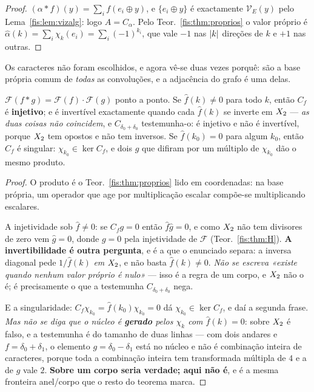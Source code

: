 \documentclass[livro.tex]{subfiles}
\begin{document}
\begin{proof}
$(\alpha*f)(y)=\sum_i f(e_i\oplus y)$, e $\{e_i\oplus y\}$ é exactamente
$\mathcal{V}_E(y)$ pelo Lema~\ref{fis:lem:vizalg}: logo $A=C_\alpha$. Pelo Teor.~\ref{fis:thm:proprios} o valor próprio é
$\widehat{\alpha}(k)=\sum_i\chi_k(e_i)=\sum_i(-1)^{k_i}$, que vale $-1$ nas
$\lvert k\rvert$ direções de $k$ e $+1$ nas outras.
\end{proof}

\medskip\noindent Os caracteres não foram escolhidos, e agora vê-se duas vezes
porquê: são a base própria comum de \emph{todas} as convoluções, e a adjacência
do grafo é uma delas.

\begin{teorema}\label{fis:thm:conv}
$\mathcal{F}(f*g)=\mathcal{F}(f)\cdot \mathcal{F}(g)$ ponto a ponto. Se
$\widehat{f}(k)\neq0$ para todo $k$, então $C_f$ é \textbf{injetivo}; e é
invertível exactamente quando cada $\widehat{f}(k)$ se inverte em $X_2$ ---
\emph{as duas coisas não coincidem}, e $C_{\delta_0+\delta_0}$ testemunha-o: é
injetivo e não é invertível, porque $X_2$ tem opostos e não tem inversos. Se $\widehat{f}(k_0)=0$ para algum $k_0$, então $C_f$ é singular:
$\chi_{k_0}\in\ker C_f$, e dois $g$ que difiram por um múltiplo de $\chi_{k_0}$
dão o mesmo produto.
\end{teorema}

\begin{proof}
O produto é o Teor.~\ref{fis:thm:proprios} lido em coordenadas: na base própria,
um operador que age por multiplicação escalar compõe-se multiplicando escalares.

\smallskip\noindent A injetividade sob $\widehat f\neq0$: se $C_fg=0$ então
$\widehat f\widehat g=0$, e como $X_2$ não tem divisores de zero vem
$\widehat g=0$, donde $g=0$ pela injetividade de $\mathcal F$
(Teor.~\ref{fis:thm:H}). \textbf{A invertibilidade é outra pergunta}, e é a que
o enunciado separa: a inversa diagonal pede $1/\widehat f(k)$ \emph{em} $X_2$,
e não basta $\widehat f(k)\neq0$. \emph{Não se escreva «existe quando nenhum
valor próprio é nulo»} --- isso é a regra de um corpo, e $X_2$ não o é; é
precisamente o que a testemunha $C_{\delta_0+\delta_0}$ nega.

\smallskip\noindent E a singularidade: $C_f\chi_{k_0}=\widehat f(k_0)\chi_{k_0}=0$
dá $\chi_{k_0}\in\ker C_f$, e daí a segunda frase. \emph{Mas não se diga que o
núcleo é \textbf{gerado} pelos $\chi_k$ com $\widehat f(k)=0$}: sobre $X_2$ é
falso, e a testemunha é do tamanho de duas linhas --- com dois andares e
$f=\delta_0+\delta_1$, o elemento $g=\delta_0-\delta_1$ está no núcleo e não é
combinação inteira de caracteres, porque toda a combinação inteira tem
transformada múltipla de $4$ e a de $g$ vale $2$. \textbf{Sobre um corpo seria
verdade; aqui não é}, e é a mesma fronteira anel/corpo que o resto do teorema
marca.
\end{proof}
\end{document}
